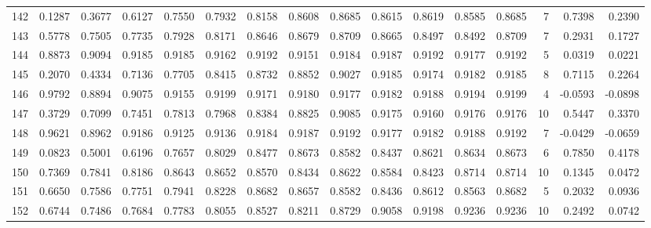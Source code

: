\begin{tabular}{lrrrrrrrrrrrrrrr}
142 &      0.1287 &  0.3677 &  0.6127 &  0.7550 &  0.7932 &  0.8158 &  0.8608 &  0.8685 &  0.8615 &  0.8619 &   0.8585 &     0.8685 &      7 &                    0.7398 &                     0.2390 \\
143 &      0.5778 &  0.7505 &  0.7735 &  0.7928 &  0.8171 &  0.8646 &  0.8679 &  0.8709 &  0.8665 &  0.8497 &   0.8492 &     0.8709 &      7 &                    0.2931 &                     0.1727 \\
144 &      0.8873 &  0.9094 &  0.9185 &  0.9185 &  0.9162 &  0.9192 &  0.9151 &  0.9184 &  0.9187 &  0.9192 &   0.9177 &     0.9192 &      5 &                    0.0319 &                     0.0221 \\
145 &      0.2070 &  0.4334 &  0.7136 &  0.7705 &  0.8415 &  0.8732 &  0.8852 &  0.9027 &  0.9185 &  0.9174 &   0.9182 &     0.9185 &      8 &                    0.7115 &                     0.2264 \\
146 &      0.9792 &  0.8894 &  0.9075 &  0.9155 &  0.9199 &  0.9171 &  0.9180 &  0.9177 &  0.9182 &  0.9188 &   0.9194 &     0.9199 &      4 &                   -0.0593 &                    -0.0898 \\
147 &      0.3729 &  0.7099 &  0.7451 &  0.7813 &  0.7968 &  0.8384 &  0.8825 &  0.9085 &  0.9175 &  0.9160 &   0.9176 &     0.9176 &     10 &                    0.5447 &                     0.3370 \\
148 &      0.9621 &  0.8962 &  0.9186 &  0.9125 &  0.9136 &  0.9184 &  0.9187 &  0.9192 &  0.9177 &  0.9182 &   0.9188 &     0.9192 &      7 &                   -0.0429 &                    -0.0659 \\
149 &      0.0823 &  0.5001 &  0.6196 &  0.7657 &  0.8029 &  0.8477 &  0.8673 &  0.8582 &  0.8437 &  0.8621 &   0.8634 &     0.8673 &      6 &                    0.7850 &                     0.4178 \\
150 &      0.7369 &  0.7841 &  0.8186 &  0.8643 &  0.8652 &  0.8570 &  0.8434 &  0.8622 &  0.8584 &  0.8423 &   0.8714 &     0.8714 &     10 &                    0.1345 &                     0.0472 \\
151 &      0.6650 &  0.7586 &  0.7751 &  0.7941 &  0.8228 &  0.8682 &  0.8657 &  0.8582 &  0.8436 &  0.8612 &   0.8563 &     0.8682 &      5 &                    0.2032 &                     0.0936 \\
152 &      0.6744 &  0.7486 &  0.7684 &  0.7783 &  0.8055 &  0.8527 &  0.8211 &  0.8729 &  0.9058 &  0.9198 &   0.9236 &     0.9236 &     10 &                    0.2492 &                     0.0742 \\

\end{tabular}
